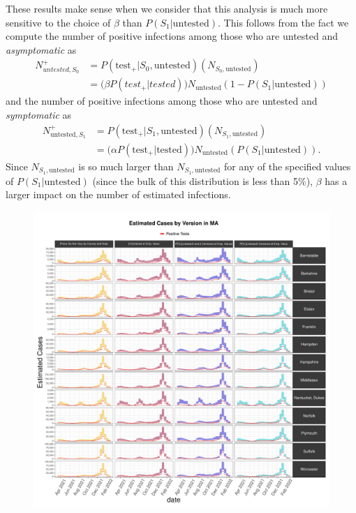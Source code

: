 \documentclass[12pt,twoside]{smiththesis}
\begin{document}
These results make sense when we consider that this analysis is much more sensitive to the choice of \(\beta\) than \(P(S_1|\text{untested})\). This follows from the fact we compute the number of positive infections among those who are untested and \emph{asymptomatic} as
\begin{align*}
N^+_{untested,S_0} &= P(\text{test}_+| S_0,\text{untested}) (N_{S_0,\text{untested}})\\
&= \Big( \beta P(test_+ |tested) \Big) N_{\text{untested}} (1-P(S_1|\text{untested}))
\end{align*}
and the number of positive infections among those who are untested and \emph{symptomatic} as\\
\begin{align*} N^+_{\text{untested},S_1}& = P(\text{test}_+| S_1,\text{untested}) (N_{S_1,\text{untested}})\\
&= \Big( \alpha P(\text{test}_+ |\text{tested}) \Big) N_{\text{untested}} (P(S_1|\text{untested})).
\end{align*}
Since \(N_{S_1, \text{untested}}\) is so much larger than \(N_{S_1, \text{untested}}\) for any of the specified values of \(P(S_1|\text{untested})\) (since the bulk of this distribution is less than 5\%), \(\beta\) has a larger impact on the number of estimated infections.
\begin{figure}
\includegraphics[width=0.95\linewidth]{figure/ma_pb_compared_to_observed} \caption{\label{fig:pb_counts_ma}}\label{fig:unnamed-chunk-71}
\end{figure}
\end{document}
